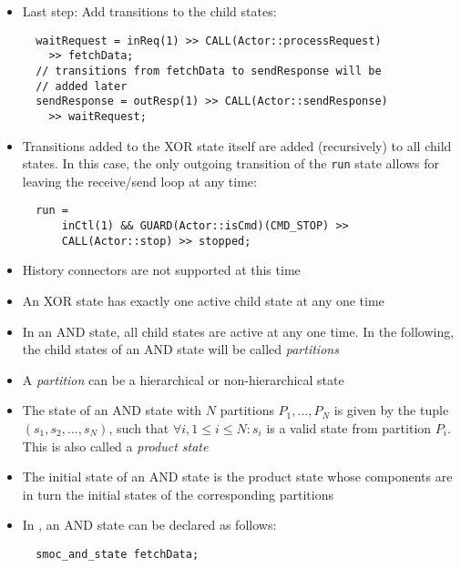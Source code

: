 \begin{frame}[fragile=singleslide]
\begin{itemize}
\item Last step: Add transitions to the child states:
\begin{lstlisting}
  waitRequest = inReq(1) >> CALL(Actor::processRequest)
    >> fetchData;
  // transitions from fetchData to sendResponse will be
  // added later
  sendResponse = outResp(1) >> CALL(Actor::sendResponse)
    >> waitRequest;
\end{lstlisting}
\item Transitions added to the XOR state itself are added (recursively) to all child states. In this case, the only outgoing transition of the \texttt{run} state allows for leaving the receive/send loop at any time: 
\begin{lstlisting}
  run =
      inCtl(1) && GUARD(Actor::isCmd)(CMD_STOP) >>
      CALL(Actor::stop) >> stopped;
\end{lstlisting}
\item History connectors are not supported at this time
\end{itemize}
\end{frame}

\begin{frame}[fragile=singleslide]
\begin{itemize}
\item An XOR state has exactly one active child state at any one time
\item In an AND state, all child states are active at any one time. In the following, the child states of an AND state will be called \emph{partitions}
\item A \emph{partition} can be a hierarchical or non-hierarchical state
\item The state of an AND state with $N$ partitions $P_1,\ldots,P_N$ is given by the tuple $(s_1,s_2,\ldots,s_N)$, such that $\forall i, 1 \leq i \leq N: s_i $ is a valid state from partition $P_i$. This is also called a \emph{product state}
\item The initial state of an AND state is the product state whose components are in turn the initial states of the corresponding partitions
\item In \SysteMoC, an AND state can be declared as follows: 
\begin{lstlisting}
  smoc_and_state fetchData;
\end{lstlisting}
\end{itemize}
\end{frame}

